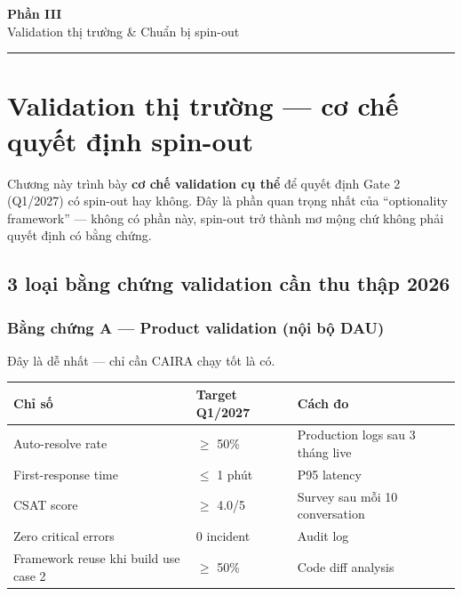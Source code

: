 \documentclass[11pt,a4paper]{article}
\begin{document}
\clearpage

\begin{center}
\vspace*{0.5em}
{\sffamily\bfseries\Huge\color{spinout} Phần III}\\[0.5em]
{\sffamily\LARGE\color{mid} Validation thị trường \& Chuẩn bị spin-out}\\[0.5em]
{\color{spinout}\rule{6cm}{0.4pt}}
\end{center}
\vspace{1em}

\section{Validation thị trường --- cơ chế quyết định spin-out}

Chương này trình bày \textbf{cơ chế validation cụ thể} để quyết định Gate 2
(Q1/2027) có spin-out hay không. Đây là phần quan trọng nhất của
``optionality framework'' --- không có phần này, spin-out trở thành mơ mộng
chứ không phải quyết định có bằng chứng.

\subsection{3 loại bằng chứng validation cần thu thập 2026}

\subsubsection*{Bằng chứng A --- Product validation (nội bộ DAU)}

Đây là dễ nhất --- chỉ cần CAIRA chạy tốt là có.

\begin{tabularx}{\linewidth}{@{}p{4cm} p{3cm} X@{}}
\toprule
\textbf{Chỉ số} & \textbf{Target Q1/2027} & \textbf{Cách đo} \\
\midrule
Auto-resolve rate & $\geq$ 50\% & Production logs sau 3 tháng live \\
First-response time & $\leq$ 1 phút & P95 latency \\
CSAT score & $\geq$ 4.0/5 & Survey sau mỗi 10 conversation \\
Zero critical errors & 0 incident & Audit log \\
Framework reuse khi build use case 2 & $\geq$ 50\% & Code diff analysis \\
\bottomrule
\end{tabularx}
\end{document}
